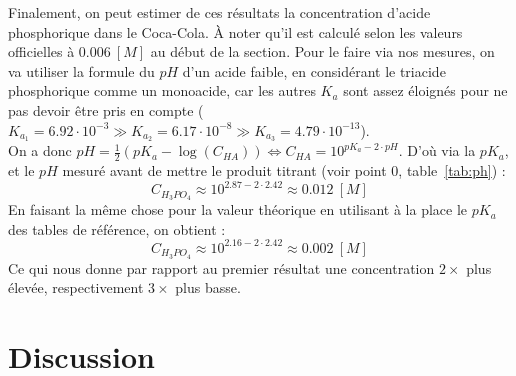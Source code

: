 \documentclass[11pt]{article}
\begin{document}
Finalement, on peut estimer de ces résultats la concentration d'acide phosphorique dans le Coca-Cola.
À noter qu'il est calculé selon les valeurs officielles à $0.006 \ [M]$ au début de la section.
Pour le faire via nos mesures, on va utiliser la formule du $pH$ d'un acide faible, en considérant le
triacide phosphorique comme un monoacide, car les autres $K_a$ sont assez éloignés pour ne pas devoir être pris en
compte ($K_{a_1} = 6.92 \cdot 10^{-3} \gg K_{a_2} = 6.17 \cdot 10^{-8} \gg K_{a_3} = 4.79 \cdot 10^{-13} $).\\
On a donc $pH = \frac{1}{2} (pK_a - \log(C_{HA})) \Leftrightarrow C_{HA} = 10^{pK_a - 2 \cdot pH}$.
D'où via la $pK_a$, et le $pH$ mesuré avant de mettre le produit titrant (voir point 0, table~\ref{tab:ph}) :
\[ C_{H_3PO_4} \approx 10^{2.87 - 2 \cdot 2.42} \approx 0.012 \ [M] \]
En faisant la même chose pour la valeur théorique en utilisant à la place le $pK_a$ des tables de référence, on obtient :
\[ C_{H_3PO_4} \approx 10^{2.16 - 2 \cdot 2.42} \approx 0.002 \ [M] \]
Ce qui nous donne par rapport au premier résultat une concentration $2 \times$ plus élevée, respectivement
$3 \times$ plus basse.

\section{Discussion}\label{sec:discussion}
\end{document}
